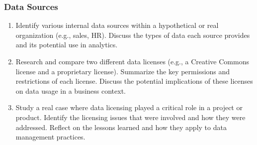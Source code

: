 \begin{exerciseboxcomputer}
\subsubsection*{Data Sources}
\begin{enumerate}
    \item Identify various internal data sources within a hypothetical or real organization (e.g., sales, HR). Discuss the types of data each source provides and its potential use in analytics.
    \item Research and compare two different data licenses (e.g., a Creative Commons license and a proprietary license). Summarize the key permissions and restrictions of each license. Discuss the potential implications of these licenses on data usage in a business context.
    \item Study a real case where data licensing played a critical role in a project or product. Identify the licensing issues that were involved and how they were addressed. Reflect on the lessons learned and how they apply to data management practices.
\end{enumerate}
\end{exerciseboxcomputer}
